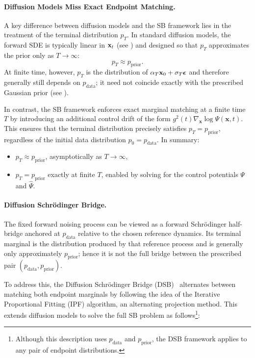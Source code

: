 \paragraph{Diffusion Models Miss Exact Endpoint Matching.}
A key difference between diffusion models and the SB framework lies in the treatment of the terminal distribution $p_T$. In standard diffusion models, the forward SDE is typically linear in ${\mathbf{x}}_t$ (see ) and designed so that $p_T$ approximates the  prior only as $T \to \infty$:
\[
    p_T \approx p_{\mathrm{prior}}.
\]
At finite time, however, $p_T$ is the distribution of
$\alpha_T{\mathbf{x}}_0+\sigma_T{\bm{\epsilon}}$ and therefore generally still depends on
$p_{\mathrm{data}}$; it need not coincide exactly with the prescribed
Gaussian prior (see ).



In contrast, the SB framework enforces exact marginal matching at a finite time $T$ by introducing an additional control drift of the form $g^2(t)\nabla_\mathbf{x}\log \Psi(\mathbf{x}, t)$. This ensures that the terminal distribution precisely satisfies $p_T = p_{\mathrm{prior}}$, regardless of the initial data distribution $p_0 = p_{\mathrm{data}}$. In summary:
\begin{itemize}
    \item {} $p_T \approx p_{\mathrm{prior}}$, asymptotically as $T \to \infty$,
    \item {} $p_T = p_{\mathrm{prior}}$ exactly at finite $T$, enabled by solving for the control potentials $\Psi$ and $\widehat{\Psi}$.
\end{itemize}

\paragraph{Diffusion Schrödinger Bridge.} 
The fixed forward noising process can be viewed as a forward
Schr\"odinger half-bridge anchored at $p_{\mathrm{data}}$ relative to the
chosen reference dynamics. Its terminal marginal is the distribution
produced by that reference process and is generally only approximately
$p_{\mathrm{prior}}$; hence it is not the full bridge between the
prescribed pair $(p_{\mathrm{data}},p_{\mathrm{prior}})$.

To address this, the Diffusion Schrödinger Bridge (DSB)~\citep{de2021diffusion} alternates between matching both endpoint marginals by following the idea of the Iterative Proportional Fitting (IPF) algorithm, an alternating projection method. This extends diffusion models to solve the full SB problem as follows\footnote{Although this description uses $p_{\mathrm{data}}$ and $p_{\mathrm{prior}}$, the DSB framework applies to any pair of endpoint distributions.}:

